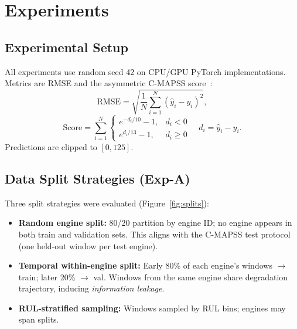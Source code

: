\documentclass[10pt,twocolumn]{article}
\begin{document}
\section{Experiments}

\subsection{Experimental Setup}

All experiments use random seed 42 on CPU/GPU PyTorch implementations.
Metrics are RMSE and the asymmetric C-MAPSS score~\cite{saxena2008}:
\begin{equation}
  \mathrm{RMSE} = \sqrt{\frac{1}{N}\sum_{i=1}^{N}(\hat{y}_i - y_i)^2},
\end{equation}
\begin{equation}
  \mathrm{Score} = \sum_{i=1}^{N}
  \begin{cases}
    e^{-d_i/10} - 1, & d_i < 0 \\
    e^{d_i/13} - 1,  & d_i \geq 0
  \end{cases}
  \quad d_i = \hat{y}_i - y_i.
\end{equation}
Predictions are clipped to $[0, 125]$.

\subsection{Data Split Strategies (Exp-A)}

Three split strategies were evaluated (Figure~\ref{fig:splits}):

\begin{itemize}
  \item \textbf{Random engine split:} 80/20 partition by engine ID; no engine appears in both train and validation sets. This aligns with the C-MAPSS test protocol (one held-out window per test engine).
  \item \textbf{Temporal within-engine split:} Early 80\% of each engine's windows $\rightarrow$ train; later 20\% $\rightarrow$ val. Windows from the same engine share degradation trajectory, inducing \emph{information leakage}.
  \item \textbf{RUL-stratified sampling:} Windows sampled by RUL bins; engines may span splits.
\end{itemize}
\end{document}
